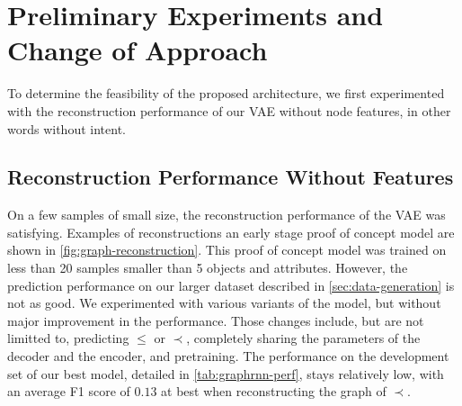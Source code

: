 
\section{Preliminary Experiments and Change of Approach\label{sec:graph-expe}}
To determine the feasibility of the proposed architecture, we first experimented with the reconstruction performance of our VAE without node features, in other words without intent.

\subsection{Reconstruction Performance Without Features}
On a few samples of small size, the reconstruction performance of the VAE was satisfying. 
Examples of reconstructions an early stage proof of concept model are shown in \cref{fig:graph-reconstruction}. This proof of concept model was trained on less than 20 samples smaller than 5 objects and attributes.
However, the prediction performance on our larger dataset described in \cref{sec:data-generation} is not as good.
We experimented with various variants of the model, but without major improvement in the performance.
Those changes include, but are not limitted to, predicting $\leq$ or $\prec$, completely sharing the parameters of the decoder and the encoder, and pretraining.
The performance on the development set of our best model, detailed in \cref{tab:graphrnn-perf}, stays relatively low, with an average F1 score of $0.13$ at best when reconstructing the graph of $\prec$.

